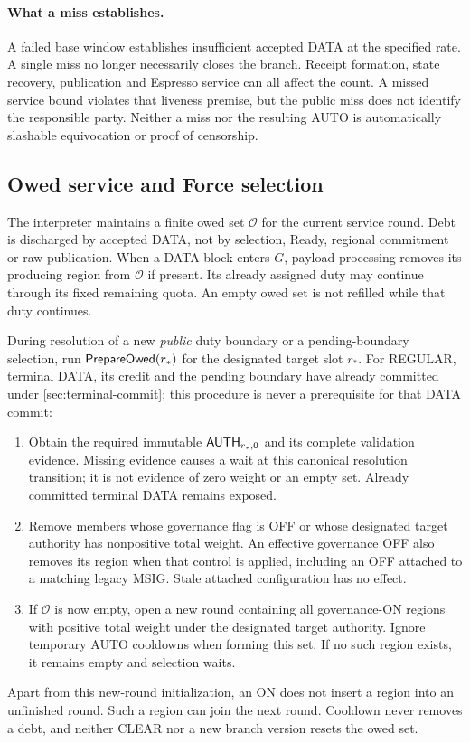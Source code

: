 \paragraph{What a miss establishes.}
A failed base window establishes insufficient accepted DATA at the
specified rate. A single miss no longer necessarily closes the branch.
Receipt formation, state recovery, publication and Espresso service can
all affect the count. A missed service bound violates that liveness
premise, but the public miss does not identify the responsible party.
Neither a miss nor the resulting AUTO is automatically slashable
equivocation or proof of censorship.

\subsection{Owed service and Force selection}
\label{sec:owed}
The interpreter maintains a finite owed set $\mathcal O$ for the
current service round. Debt is discharged by accepted DATA, not by
selection, Ready, regional commitment or raw publication. When a DATA
block enters $G$, payload processing removes its producing region
from $\mathcal O$ if present. Its already assigned duty may continue
through its fixed remaining quota. An empty owed set is not refilled
while that duty continues.

During resolution of a new \emph{public} duty boundary or a
pending-boundary selection, run $\mathsf{PrepareOwed}(r_*)$ for the
designated target slot $r_*$. For REGULAR, terminal DATA, its credit and
the pending boundary have already committed under \cref{sec:terminal-commit};
this procedure is never a prerequisite for that DATA commit:
\begin{enumerate}[label=(\roman*),itemsep=2pt]
\item Obtain the required immutable $\mathsf{AUTH}_{r_*,0}$ and its
complete validation evidence. Missing evidence causes a wait at this
canonical resolution transition; it is not evidence of zero weight or
an empty set. Already committed terminal DATA remains exposed.
\item Remove members whose governance flag is OFF or whose designated
target authority has nonpositive total weight. An effective governance
OFF also removes its region when that control is applied, including an
OFF attached to a matching legacy MSIG. Stale attached configuration
has no effect.
\item If $\mathcal O$ is now empty, open a new round containing all
governance-ON regions with positive total weight under the designated
target authority. Ignore temporary AUTO cooldowns when forming this
set. If no such region exists, it remains empty and selection waits.
\end{enumerate}
Apart from this new-round initialization, an ON does not insert a
region into an unfinished round. Such a region can join the next
round. Cooldown never removes a debt, and neither CLEAR nor a new
branch version resets the owed set.

